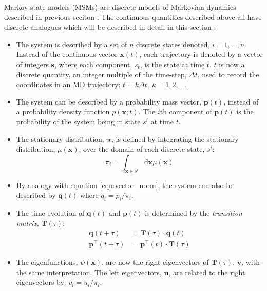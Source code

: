 Markov state models (MSMs) are discrete models of Markovian dynamics described in previous seciton \cite{prinzMarkovModelsMolecular2011}. The continuous quantities described above all have discrete analogues which will be described in detail in this section \cite{prinzMarkovModelsMolecular2011}:
\begin{itemize}
    \item The system is described by a set of $n$ discrete states denoted, $i=1, \ldots, n$. Instead of the continuous vector $\mathbf{x}(t)$, each trajectory is denoted by a vector of integers $\mathbf{s}$, where each component, $s_t$, is the state at time $t$. $t$ is now a discrete quantity, an integer multiple of the time-step, $\Delta t$, used to record the coordinates in an MD trajectory: $t=k\Delta t,\ k=1, 2, \ldots$. 
    \item The system can be described by a probability mass vector, $\mathbf{p}(t)$,  instead of a probability density function $p(\mathbf{x};t)$. The $i$th component of $\mathbf{p}(t)$ is the probability of the system being in  state $s^{i}$ at time $t$.
    \item The stationary distribution, $\bm{\pi}$, is defined by integrating the stationary distribution, $\mu(\mathbf{x})$, over the domain of each discrete state, $s^{i}$:
        \begin{equation*}
            \pi_{i}=\int_{\mathbf{x} \in s^{i}} \mathrm{d}\mathbf{x}\mu(\mathbf{x})
        \end{equation*}
    \item By analogy with equation \ref{eqn:vector_norm}, the system can also be described by $\mathbf{q}(t)$ where $q_{i} = p_{i}/\pi_{i}$.
    \item The time evolution of $\mathbf{q}(t)$ and $\mathbf{p}(t)$ is determined by the \emph{transition matrix}, $\mathbf{T}(\tau)$:
        \begin{align*}
            \mathbf{q}(t+\tau) &= \mathbf{T}(\tau) \cdot \mathbf{q}(t) \\
            \mathbf{p}^{\top}(t+\tau) & = \mathbf{p}^{\top}(t)\cdot \mathbf{T}(\tau)
        \end{align*}
    \item The eigenfunctions, $\psi(\mathbf{x})$, are now the right eigenvectors of $\mathbf{T}(\tau)$, $\mathbf{v}$, with the same interpretation. The left eigenvectors, $\mathbf{u}$, are related to the right eigenvectors by: $v_{i} = u_{i}/\pi_{i}$.  
 \end{itemize}


